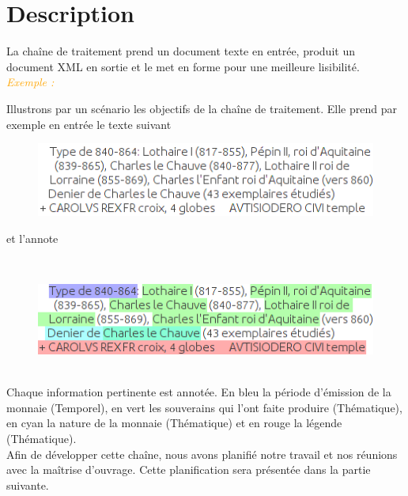 \documentclass[a4paper, 11pt]{report}
\newenvironment{exemple}
    {
    \textit{\textcolor{orange}{
    Exemple : \\}}
    }
    {
    ~\\
    }
\begin{document}
    \section{Description}
    La chaîne de traitement prend un document texte en entrée, produit un document XML en sortie et le met en forme pour une meilleure lisibilité.\\
    \begin{exemple}
\noindent Illustrons par un scénario les objectifs de la chaîne de traitement.
Elle prend par exemple en entrée le texte suivant

\begin{figure}[h!]
\centering
\includegraphics[scale=.5]{img/exemple_text.png}
\end{figure}

et l'annote
\end{exemple}
\begin{figure}[h!]
\centering
\includegraphics[scale=.5]{img/exemple_text_ann.png} 
\end{figure}\\
Chaque information pertinente est annotée. En bleu la période d'émission de la monnaie (Temporel), en vert les souverains qui l'ont faite produire (Thématique), en cyan la nature de la monnaie (Thématique) et en rouge la légende (Thématique).\\
Afin de développer cette chaîne, nous avons planifié notre travail et nos réunions avec la maîtrise d'ouvrage. Cette planification sera présentée dans la partie suivante.
\end{document}

